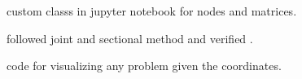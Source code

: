 \documentclass{beamer}
\begin{document}
\begin{frame}
    \begin{exampleblock}{\textbf{}}
     custom classs in jupyter notebook for nodes and matrices.
        

    \end{exampleblock}\vspace{20pt}



 \begin{block} {\textbf{}}
     followed joint and sectional method and verified .
\end{block}\vspace{20pt}

    \begin{block}{\textbf{}}
        code for visualizing any problem given the coordinates.

    \end{block}

\end{frame} 
\end{document}
